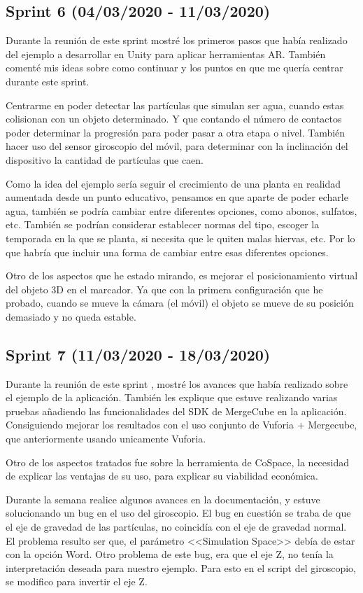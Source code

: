 \subsection{Sprint 6 (04/03/2020 - 11/03/2020)}

Durante la reunión de este sprint mostré los primeros pasos que había realizado del ejemplo a desarrollar en Unity para aplicar herramientas AR. También comenté mis ideas sobre como continuar y los puntos en que me quería centrar durante este sprint.

Centrarme en poder detectar las partículas que simulan ser agua, cuando estas colisionan con un objeto determinado. Y que contando el número de contactos poder determinar la progresión para poder pasar a otra etapa o nivel. También hacer uso del sensor giroscopio del móvil, para determinar con la inclinación del dispositivo la cantidad de partículas que caen.

Como la idea del ejemplo sería seguir el crecimiento de una planta en realidad aumentada desde un punto educativo, pensamos en que aparte de poder echarle agua, también se podría cambiar entre diferentes opciones, como abonos, sulfatos, etc. También se podrían considerar establecer normas del tipo, escoger la temporada en la que se planta, si necesita que le quiten malas hiervas, etc. Por lo que habría que incluir una forma de cambiar entre esas diferentes opciones.

Otro de los aspectos que he estado mirando, es mejorar el posicionamiento virtual del objeto 3D en el marcador. Ya que con la primera configuración que he probado, cuando se mueve la cámara (el móvil) el objeto se mueve de su posición demasiado y no queda estable.

\subsection{Sprint 7 (11/03/2020 - 18/03/2020)}
Durante la reunión de este sprint , mostré los avances que había realizado sobre el ejemplo de la aplicación. También les explique que estuve realizando varias pruebas añadiendo las funcionalidades del SDK de MergeCube en la aplicación. Consiguiendo mejorar los resultados con el uso conjunto de Vuforia + Mergecube, que anteriormente usando unicamente Vuforia.

Otro de los aspectos tratados fue sobre la herramienta de CoSpace, la necesidad de explicar las ventajas de su uso, para explicar su viabilidad económica.

Durante la semana realice algunos avances en la documentación, y estuve solucionando un bug en el uso del giroscopio. El bug en cuestión se traba de que el eje de gravedad de las partículas, no coincidía con el eje de gravedad normal. El problema resulto ser que, el parámetro <<Simulation Space>> debía de estar con la opción Word. Otro problema de este bug, era que el eje Z, no tenía la interpretación deseada para nuestro ejemplo. Para esto en el script del giroscopio, se modifico para invertir el eje Z.
 
